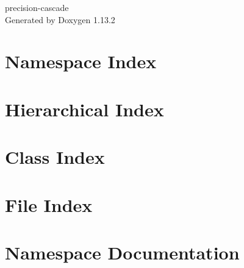 \documentclass[twoside]{book}
\newcommand{\+}{\discretionary{\mbox{\scriptsize$\hookleftarrow$}}{}{}}
\newcommand{\clearemptydoublepage}{%
    \newpage{\pagestyle{empty}\cleardoublepage}%
  }
\begin{document}
  \raggedbottom
    \hypersetup{pageanchor=false,
                bookmarksnumbered=true,
                pdfencoding=unicode
               }
  \begin{titlepage}
  \vspace*{7cm}
  \begin{center}%
  {\Large precision-\/cascade}\\
  \vspace*{1cm}
  {\large Generated by Doxygen 1.13.2}\\
  \end{center}
  \end{titlepage}
  \clearemptydoublepage
  \tableofcontents
  \clearemptydoublepage
  \hypersetup{pageanchor=true}
\chapter{Namespace Index}

\chapter{Hierarchical Index}

\chapter{Class Index}

\chapter{File Index}

\chapter{Namespace Documentation}









\end{document}
